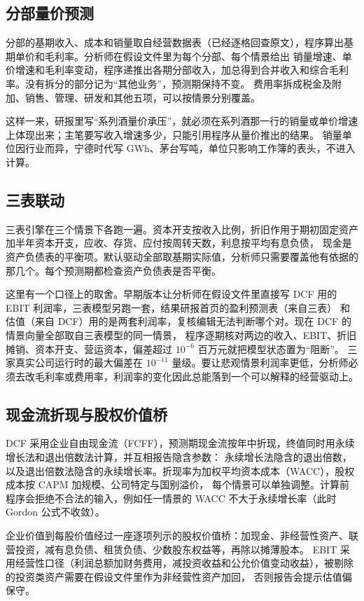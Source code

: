 \subsection{分部量价预测}

分部的基期收入、成本和销量取自经营数据表（已经逐格回查原文），程序算出基期单价和毛利率。分析师在假设文件里为每个分部、每个情景给出
销量增速、单价增速和毛利率变动，程序递推出各期分部收入，加总得到合并收入和综合毛利率。没有拆分的部分记为“其他业务”，预测期保持不变。
费用率拆成税金及附加、销售、管理、研发和其他五项，可以按情景分别覆盖。

这样一来，研报里写“系列酒量价承压”，就必须在系列酒那一行的销量或单价增速上体现出来；主笔要写收入增速多少，只能引用程序从量价推出的结果。
销量单位因行业而异，宁德时代写 GWh、茅台写吨，单位只影响工作簿的表头，不进入计算。

\subsection{三表联动}

三表引擎在三个情景下各跑一遍。资本开支按收入比例，折旧作用于期初固定资产加半年资本开支，应收、存货、应付按周转天数，利息按平均有息负债，
现金是资产负债表的平衡项。默认驱动全部取基期实际值，分析师只需要覆盖他有依据的那几个。每个预测期都检查资产负债表是否平衡。

这里有一个口径上的取舍。早期版本让分析师在假设文件里直接写 DCF 用的 EBIT 利润率，三表模型另跑一套，结果研报首页的盈利预测表（来自三表）
和估值（来自 DCF）用的是两套利润率，复核编辑无法判断哪个对。现在 DCF 的情景向量全部取自三表模型的同一情景，
程序逐期核对两边的收入、EBIT、折旧摊销、资本开支、营运资本，偏差超过 $10^{-6}$ 百万元就把模型状态置为“阻断”。
三家真实公司运行时的最大偏差在 $10^{-11}$ 量级。要让悲观情景利润率更低，分析师必须去改毛利率或费用率，利润率的变化因此总能落到一个可以解释的经营驱动上。

\subsection{现金流折现与股权价值桥}

DCF 采用企业自由现金流（FCFF），预测期现金流按年中折现，终值同时用永续增长法和退出倍数法计算，并互相报告隐含参数：
永续增长法隐含的退出倍数，以及退出倍数法隐含的永续增长率。折现率为加权平均资本成本（WACC），股权成本按 CAPM 加规模、公司特定与国别溢价，
每个情景可以单独调整。计算前程序会拒绝不合法的输入，例如任一情景的 WACC 不大于永续增长率（此时 Gordon 公式不收敛）。

企业价值到每股价值经过一座逐项列示的股权价值桥：加现金、非经营性资产、联营投资，减有息负债、租赁负债、少数股东权益等，再除以摊薄股本。
EBIT 采用经营性口径（利润总额加财务费用，减投资收益和公允价值变动收益），被剔除的投资类资产需要在假设文件里作为非经营性资产加回，
否则报告会提示估值偏保守。

